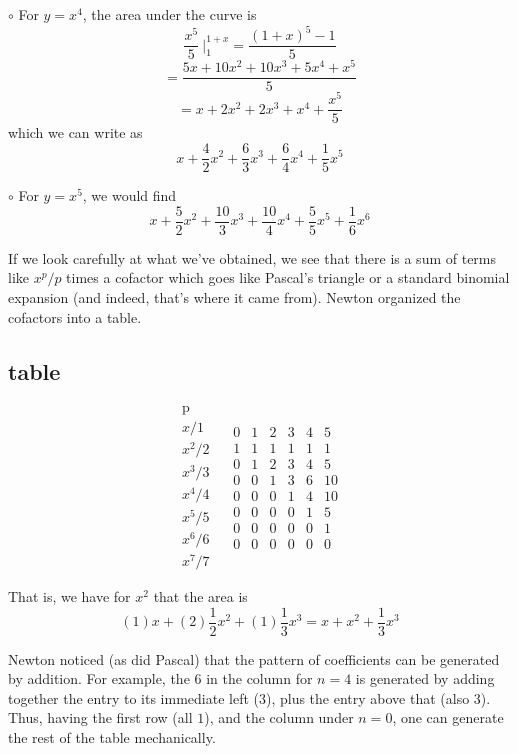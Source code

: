 \documentclass[11pt, oneside]{article}
\begin{document}
$\circ$  For $y = x^4$, the area under the curve is
\[ \frac{x^5}{5} \ \bigg |_1^{1+x} = \frac{(1+x)^5 - 1}{5}  \]
\[ = \frac{5x + 10x^2 + 10x^3 + 5x^4 + x^5}{5} \]
\[ = x + 2 x^2 +  2 x^3 + x^4 + \frac{x^5}{5}  \]
which we can write as 
\[ x + \frac{4}{2}x^2 + \frac{6}{3}x^3 + \frac{6}{4}x^4 + \frac{1}{5}x^5 \]

$\circ$  For $y = x^5$, we would find
\[ x + \frac{5}{2}x^2 + \frac{10}{3}x^3 + \frac{10}{4}x^4 + \frac{5}{5}x^5 + \frac{1}{6}x^6 \]

If we look carefully at what we've obtained, we see that there is a sum of terms like $x^p/p$ times a cofactor which goes like Pascal's triangle or a standard binomial expansion (and indeed, that's where it came from).  Newton organized the cofactors into a table.

\subsection*{table}

\[
\begin{matrix}
\text{p}  \\
x/1  \\
x^2/2 \\
x^3/3 \\
x^4/4 \\
x^5/5 \\
x^6/6 \\
x^7/7
\end{matrix} \ \ \ \
\begin{matrix}
0 & 1 & 2 & 3 & 4 & 5  \\
1 & 1 & 1 & 1 & 1 & 1  \\
0 & 1 & 2 & 3 & 4 & 5 \\
0 & 0 & 1 & 3 & 6 & 10 \\
0 & 0 & 0 & 1 & 4 & 10 \\
0 & 0 & 0 & 0 & 1 & 5 \\
0 & 0 & 0 & 0 & 0 & 1 \\
0 & 0 & 0 & 0 & 0 & 0
\end{matrix}
\]

That is, we have for $x^2$ that the area is
\[ (1)x + (2)\frac{1}{2}x^2 + (1)\frac{1}{3}x^3 = x + x^2 + \frac{1}{3}x^3 \]

Newton noticed (as did Pascal) that the pattern of coefficients can be generated by addition.  For example, the $6$ in the column for $n=4$ is generated by adding together the entry to its immediate left ($3$), plus the entry above that (also $3$).  Thus, having the first row (all $1$), and the column under $n=0$, one can generate the rest of the table mechanically.
\end{document}
